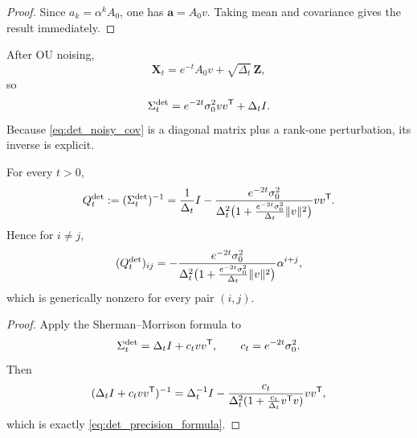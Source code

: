 \documentclass[11pt]{article}
\begin{document}
\begin{proof}
Since $a_k=\alpha^kA_0$, one has $\mathbf a=A_0v$. Taking mean and covariance gives the result immediately.
\end{proof}

After OU noising,
\begin{equation}
 \mathbf X_t=e^{-t}A_0v+\sqrt{\Delta_t}\,\mathbf Z,
\end{equation}
so
\begin{equation}\label{eq:det_noisy_cov}
 \Sigma_t^{\mathrm{det}}=
 e^{-2t}\sigma_0^2vv^{\mathsf{T}}+\Delta_tI.
\end{equation}
Because \eqref{eq:det_noisy_cov} is a diagonal matrix plus a rank-one perturbation, its inverse is explicit.

\begin{proposition}\label{prop:det_precision}
For every $t>0$,
\begin{equation}\label{eq:det_precision_formula}
 Q_t^{\mathrm{det}}
 :=(\Sigma_t^{\mathrm{det}})^{-1}
 =\frac{1}{\Delta_t}I
 -\frac{e^{-2t}\sigma_0^2}{\Delta_t^2\big(1+\frac{e^{-2t}\sigma_0^2}{\Delta_t}\lVert v\rVert^2\big)}vv^{\mathsf{T}}.
\end{equation}
Hence for $i\neq j$,
\begin{equation}
 (Q_t^{\mathrm{det}})_{ij}
 =-\frac{e^{-2t}\sigma_0^2}{\Delta_t^2\big(1+\frac{e^{-2t}\sigma_0^2}{\Delta_t}\lVert v\rVert^2\big)}\alpha^{i+j},
\end{equation}
which is generically nonzero for every pair $(i,j)$.
\end{proposition}

\begin{proof}
Apply the Sherman--Morrison formula to
\begin{equation}
 \Sigma_t^{\mathrm{det}}=\Delta_tI+c_tvv^{\mathsf{T}},
 \qquad c_t=e^{-2t}\sigma_0^2.
\end{equation}
Then
\begin{equation}
 (\Delta_tI+c_tvv^{\mathsf{T}})^{-1}
 =\Delta_t^{-1}I-\frac{c_t}{\Delta_t^2(1+\frac{c_t}{\Delta_t}v^{\mathsf{T}} v)}vv^{\mathsf{T}},
\end{equation}
which is exactly \eqref{eq:det_precision_formula}.
\end{proof}
\end{document}
